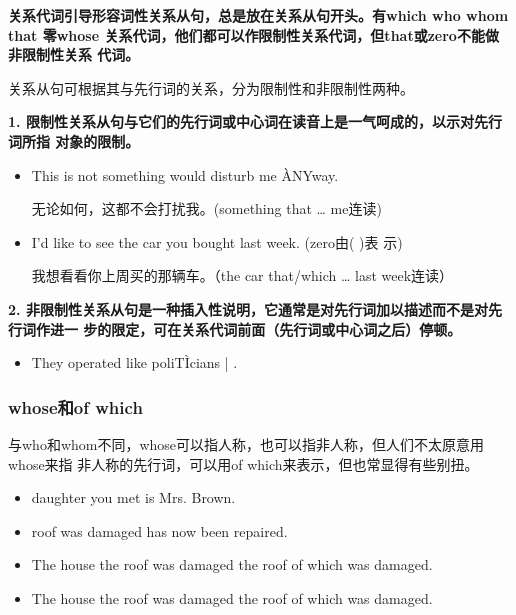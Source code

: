 \textbf{关系代词引导形容词性关系从句，总是放在关系从句开头。有which who whom that
  零whose 关系代词，他们都可以作限制性关系代词，但that或zero不能做非限制性关系
  代词。}

关系从句可根据其与先行词的关系，分为限制性和非限制性两种。

\textbf{1. 限制性关系从句与它们的先行词或中心词在读音上是一气呵成的，以示对先行词所指
  对象的限制。}
\begin{itemize}
\item This is not something  would disturb me \`{A}NYway.

  无论如何，这都不会打扰我。(something that \ldots{} me连读)
\item I'd like to see the car  you bought last week. (zero由( )表
  示)

  我想看看你上周买的那辆车。（the car that/which \ldots{} last week连读）

\end{itemize}

\textbf{2. 非限制性关系从句是一种插入性说明，它通常是对先行词加以描述而不是对先行词作进一
  步的限定，可在关系代词前面（先行词或中心词之后）停顿。}
\begin{itemize}
\item  They operated like poliT\`{I}cians | .
\end{itemize}

\subsubsection{whose和of which}

与who和whom不同，whose可以指人称，也可以指非人称，但人们不太原意用whose来指
非人称的先行词，可以用of which来表示，但也常显得有些别扭。
\begin{itemize}
\item {} daughter you met is Mrs. Brown.
\item {} roof was damaged has now been repaired.
\item The house  the roof was damaged the roof of which was damaged.
\item The house the roof  was damaged the roof of which was damaged.
\end{itemize}

